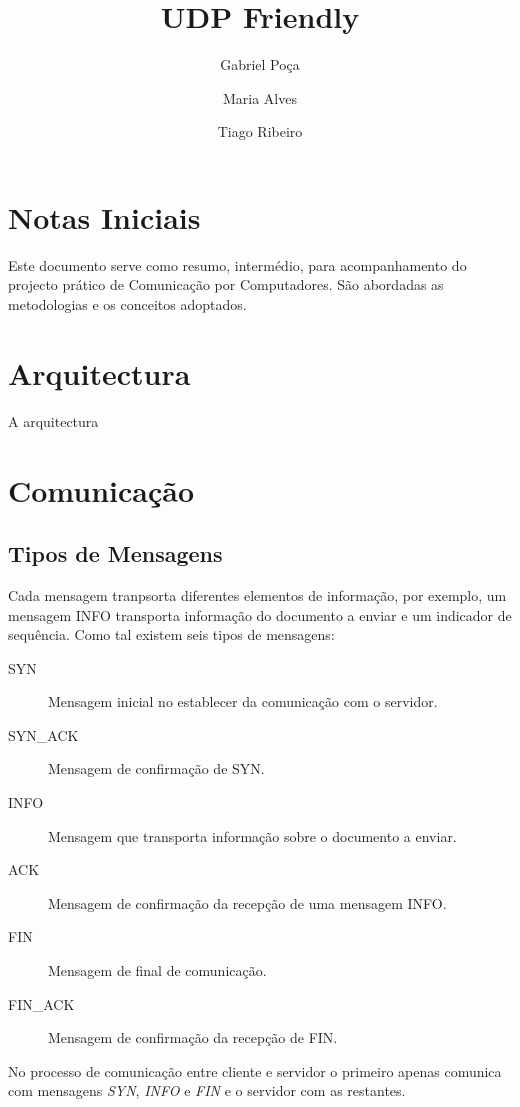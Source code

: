 \documentclass{llncs}
\begin{document}
\mainmatter
\title{UDP Friendly}


\author{Gabriel Poça \and Maria Alves \and Tiago Ribeiro}



\date{}


\maketitle

\section{Notas Iniciais}
Este documento serve como resumo, intermédio, para acompanhamento do projecto prático de Comunicação por Computadores. São abordadas as metodologias e os conceitos adoptados.

\section{Arquitectura}
A arquitectura 

\section{Comunicação}
\subsection{Tipos de Mensagens}
Cada mensagem tranpsorta diferentes elementos de informação, por exemplo, um mensagem INFO transporta informação do documento a enviar e um indicador de sequência. Como tal existem seis tipos de mensagens:
\begin{description}
	\item[SYN] Mensagem inicial no establecer da comunicação com o servidor.
	\item[SYN\_ACK] Mensagem de confirmação de SYN.
	\item[INFO] Mensagem que transporta informação sobre o documento a enviar.
	\item[ACK] Mensagem de confirmação da recepção de uma mensagem INFO.
	\item[FIN] Mensagem de final de comunicação.
	\item[FIN\_ACK] Mensagem de confirmação da recepção de FIN.
\end{description}
No processo de comunicação entre cliente e servidor o primeiro apenas comunica com mensagens \textit{SYN}, \textit{INFO} e \textit{FIN} e o servidor com as restantes.
\end{document}
